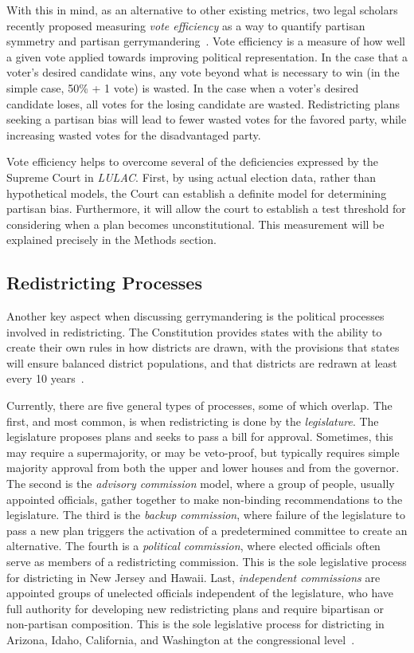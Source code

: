 \documentclass[12pt]{article}
\begin{document}
  With this in mind,  as an alternative to other existing metrics, two legal scholars recently proposed measuring \emph{vote efficiency} as a way to quantify partisan symmetry and partisan gerrymandering~\cite{stephanopoulos}.  Vote efficiency is a measure of how well a given vote applied towards improving political representation.  In the case that a voter's desired candidate wins, any vote beyond what is necessary to win (in the simple case, 50\% + 1 vote) is wasted.  In the case when a voter's desired candidate loses, all votes for the losing candidate are wasted. Redistricting plans seeking a partisan bias will lead to fewer wasted votes for the favored party, while increasing wasted votes for the disadvantaged party.

  Vote efficiency helps to overcome several of the deficiencies expressed by the Supreme Court in \emph{LULAC}.  First, by using actual election data, rather than hypothetical models, the Court can establish a definite model for determining partisan bias.  Furthermore, it will allow the court to establish a test threshold for considering when a plan becomes unconstitutional.  This measurement will be explained precisely in the Methods section.

\subsection{Redistricting Processes}
Another key aspect when discussing gerrymandering is the political processes involved in redistricting.  The Constitution provides states with the ability to create their own rules in how districts are drawn, with the provisions that states will ensure balanced district populations, and that districts are redrawn at least every 10 years~\cite{LULAC}.

Currently, there are five general types of processes, some of which overlap.  The first, and most common, is when redistricting is done by the \emph{legislature}.    The legislature proposes plans and seeks to pass a bill for approval.  Sometimes, this may require a supermajority, or may be veto-proof, but typically requires simple majority approval from both the upper and lower houses and from the governor.  The second is the \emph{advisory commission} model, where a group of people, usually appointed officials, gather together to make non-binding recommendations to the legislature.  The third is the \emph{backup commission}, where failure of the legislature to pass a new plan triggers the activation of a predetermined committee to create an alternative.  The fourth is a \emph{political commission}, where elected officials often serve as members of a redistricting commission.  This is the sole legislative process for districting in New Jersey and Hawaii.  Last, \emph{independent commissions} are appointed groups of unelected officials independent of the legislature, who have full authority for developing new redistricting plans and require bipartisan or non-partisan composition.  This is the sole legislative process for districting in Arizona, Idaho, California, and Washington at the congressional level~\cite{Levitt}.
\end{document}
